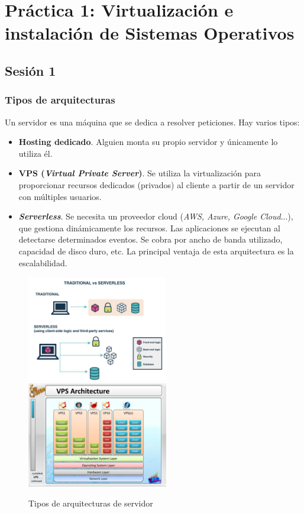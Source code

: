 \documentclass[12pt,spanish]{article}
\begin{document}
\section{Práctica 1: Virtualización e instalación de Sistemas Operativos}

\subsection{Sesión 1}

\subsubsection{Tipos de arquitecturas}

Un servidor es una máquina que se dedica a resolver peticiones. Hay varios tipos:
\begin{itemize}
  \item \textbf{Hosting dedicado}. Alguien monta su propio servidor y únicamente lo utiliza él.
  \item \textbf{VPS (\textit{Virtual Private Server})}. Se utiliza la virtualización para proporcionar recursos dedicados (privados) al cliente a partir de un servidor con múltiples usuarios.
  \item \textbf{\textit{Serverless}}. Se necesita un proveedor cloud (\textit{AWS, Azure, Google Cloud}...), que gestiona dinámicamente los recursos. Las aplicaciones se ejecutan al detectarse determinados eventos. Se cobra por ancho de banda utilizado, capacidad de disco duro, etc. La principal ventaja de esta arquitectura es la escalabilidad.
\end{itemize}

\begin{figure}[H]
  \centering
  \includegraphics[width=0.55\textwidth]{serverless.jpeg}
  \vspace{0.5cm}
  \includegraphics[width=0.55\textwidth]{vps.jpg}
  \caption{Tipos de arquitecturas de servidor}
\end{figure}
\end{document}
